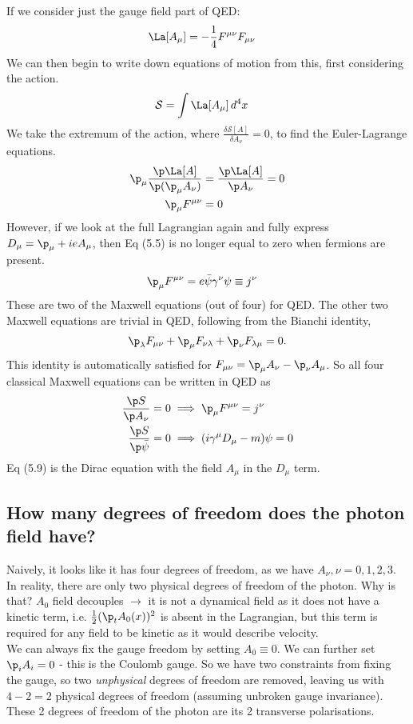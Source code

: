 \documentclass[a4paper, 11pt, normalem]{report}
\begin{document}
If we consider just the gauge field part of QED:
\begin{align}
    \La[A_\mu] &= -\frac14 F^{\mu\nu}F_{\mu\nu}
\end{align}
We can then begin to write down equations of motion from this, first considering the action.
\begin{align}
    \mathcal{S} &= \int \La[A_\mu]\,d^4x
\end{align}
We take the extremum of the action, where $\frac{\delta\mathcal{S}[A]}{\delta A_\nu}=0$, to find the Euler-Lagrange equations.
\begin{align}
    \p_\mu \frac{\p\La[A]}{\p(\p_\mu A_\nu)} &= \frac{\p\La[A]}{\p A_\nu} = 0 \\
    \p_\mu F^{\mu\nu} &= 0
\end{align}
However, if we look at the full Lagrangian again and fully express $D_\mu = \p_\mu + ieA_\mu$, then Eq (5.5) is no longer equal to zero when fermions are present.
\begin{align}
    \p_\mu F^{\mu\nu} &= e\bar{\psi}\gamma^\nu\psi \equiv j^\nu
\end{align}
These are two of the Maxwell equations (out of four) for QED.
The other two Maxwell equations are trivial in QED, following from the Bianchi identity,
\begin{align}
    \p_\lambda F_{\mu\nu} + \p_\mu F_{\nu\lambda} + \p_\nu F_{\lambda\mu} = 0.
\end{align}
This identity is automatically satisfied for $F_{\mu\nu} = \p_\mu A_\nu - \p_\nu A_\mu$.
So all four classical Maxwell equations can be written in QED as
\begin{align}
    \frac{\p S}{\p A_\nu} = 0 &\implies \p_\mu F^{\mu\nu} = j^\nu \\
    \frac{\p S}{\p \bar{\psi}} = 0 &\implies (i\gamma^\mu D_\mu - m)\psi = 0
\end{align}
Eq (5.9) is the Dirac equation with the field $A_\mu$ in the $D_\mu$ term.

\subsection{How many degrees of freedom does the photon field have?}
Naively, it looks like it has four degrees of freedom, as we have $A_\nu, \nu = 0,1,2,3$.
In reality, there are only two physical degrees of freedom of the photon.
Why is that?
$A_0$ field decouples $\to$ it is not a dynamical field as it does not have a kinetic term, i.e. $\frac12(\p_t A_0(x))^2$ is absent in the Lagrangian, but this term is required for any field to be kinetic as it would describe velocity.\\
We can always fix the gauge freedom by setting $A_0\equiv0$.
We can further set $\p_iA_i=0$ - this is the Coulomb gauge.
So we have two constraints from fixing the gauge, so two \emph{unphysical} degrees of freedom are removed, leaving us with $4-2=2$ physical degrees of freedom (assuming unbroken gauge invariance).
These 2 degrees of freedom of the photon are its 2 transverse polarisations.
\end{document}
